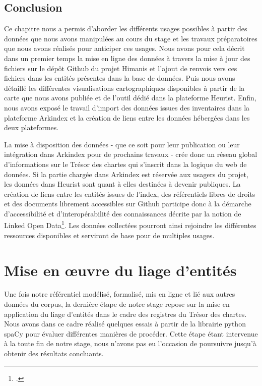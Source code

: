 \documentclass[a4paper,12pt,twoside]{book}
\begin{document}
	\section*{Conclusion}
	
	Ce chapitre nous a permis d'aborder les différents usages possibles à partir des données que nous avons manipulées au cours du stage et les travaux préparatoires que nous avons réalisés pour anticiper ces usages. Nous avons pour cela décrit dans un premier temps la mise en ligne des données à travers la mise à jour des fichiers sur le dépôt Github du projet Himanis et l'ajout de renvois vers ces fichiers dans les entités présentes dans la base de données. Puis nous avons détaillé les différentes visualisations cartographiques disponibles à partir de la carte que nous avons publiée et de l'outil dédié dans la plateforme Heurist. Enfin, nous avons exposé le travail d'import des données issues des inventaires dans la plateforme Arkindex et la création de liens entre les données hébergées dans les deux plateformes.
	
	La mise à disposition des données - que ce soit pour leur publication ou leur intégration dans Arkindex pour de prochains travaux - crée donc un réseau global d'informations sur le Trésor des chartes qui s'inscrit dans la logique du web de données. Si la partie chargée dans Arkindex est réservée aux usagers du projet, les données dans Heurist sont quant à elles destinées à devenir publiques. La création de liens entre les entités issues de l'index, des référentiels libres de droits et des documents librement accessibles sur Github participe donc à la démarche d'accessibilité et d'interopérabilité des connaissances décrite par la notion de Linked Open Data\footcite{hugi_vous_2013}. Les données collectées pourront ainsi rejoindre les différentes ressources disponibles et serviront de base pour de multiples usages.
	
	\chapter{Mise en œuvre du liage d'entités}
	
	Une fois notre référentiel modélisé, formalisé, mis en ligne et lié aux autres données du corpus, la dernière étape de notre stage repose sur la mise en application du liage d'entités dans le cadre des registres du Trésor des chartes. Nous avons dans ce cadre réalisé quelques essais à partir de la librairie python spaCy pour évaluer différentes manières de procéder. Cette étape étant intervenue à la toute fin de notre stage, nous n'avons pas eu l'occasion de poursuivre jusqu'à obtenir des résultats concluants.
	
\end{document}
